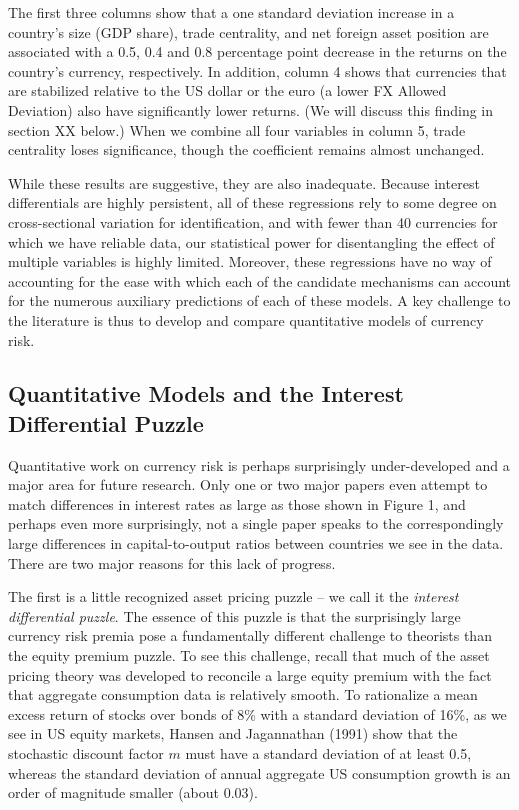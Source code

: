 \documentclass{ar-1col}
\begin{document}
The first three columns show that a one standard deviation increase in a country's size (GDP share), trade centrality, and net foreign asset position are associated with a 0.5, 0.4 and 0.8 percentage point decrease in the returns on the country's currency, respectively. In addition, column 4 shows that currencies that are stabilized relative to the US dollar or the euro (a lower FX Allowed Deviation) also have significantly lower returns. (We will discuss this finding in section XX below.) When we combine all four variables in column 5, trade centrality loses significance, though the coefficient remains almost unchanged.

While these results are suggestive, they are also inadequate. Because interest differentials are highly persistent, all of these regressions rely to some degree on cross-sectional variation for identification, and with fewer than 40 currencies for which we have reliable data, our statistical power for disentangling the effect of multiple variables is highly limited. Moreover, these regressions have no way of accounting for the ease with which each of the candidate mechanisms can account for the numerous auxiliary predictions of each of these models. A key challenge to the literature is thus to develop and compare quantitative models of currency risk.

\subsection{Quantitative Models and the Interest Differential Puzzle}

Quantitative work on currency risk is perhaps surprisingly under-developed and a major area for future research. Only one or two major papers even attempt to match differences in interest rates as large as those shown in Figure 1, and perhaps even more surprisingly, not a single paper speaks to the correspondingly large differences in capital-to-output ratios between countries we see in the data. There are two major reasons for this lack of progress.

The first is a little recognized asset pricing puzzle -- we call it the \textit{interest differential puzzle}. The essence of this puzzle is that the surprisingly large currency risk premia pose a fundamentally different challenge to theorists than the equity premium puzzle. To see this challenge, recall that much of the asset pricing theory was developed to reconcile a large equity premium with the fact that aggregate consumption data is relatively smooth. To rationalize a mean excess return of stocks over bonds of 8\% with a standard deviation of 16\%, as we see in US equity markets, Hansen and Jagannathan (1991) show that the stochastic discount factor $m$ must have a standard deviation of at least 0.5, whereas the standard deviation of annual aggregate US consumption growth is an order of magnitude smaller (about 0.03).  
\end{document}
